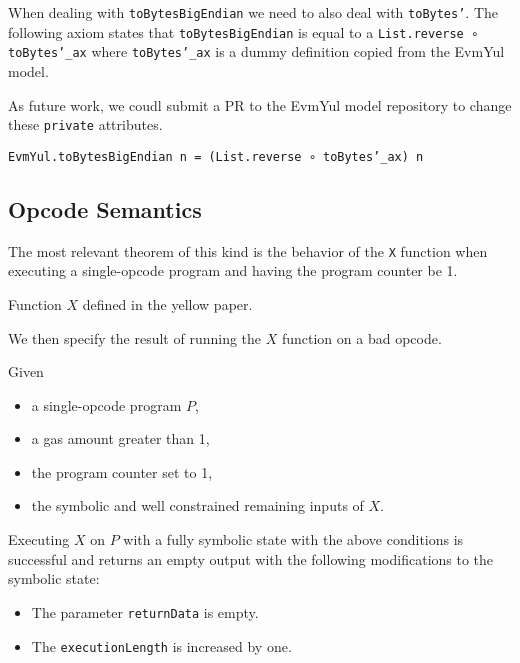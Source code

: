When dealing with \texttt{toBytesBigEndian} we need to also deal with
\texttt{toBytes'}. The following axiom states that \texttt{toBytesBigEndian} is
equal to a \texttt{List.reverse ∘ toBytes'_ax} where \texttt{toBytes'_ax} is a
dummy definition copied from the EvmYul model.

As future work, we coudl submit a PR to the EvmYul model repository to change
these \texttt{private} attributes.

\begin{theorem}
\label{thm:toBytesBigEndian_rw}
\texttt{EvmYul.toBytesBigEndian n = (List.reverse ∘ toBytes'_ax) n}
\end{theorem}

\subsection{Opcode Semantics}

The most relevant theorem of this kind is the behavior of the \texttt{X}
function when executing a single-opcode program and having the program counter
be 1.

\begin{definition}\label{def:X}\leanok
Function $X$ defined in the yellow paper.
\end{definition}

We then specify the result of running the $X$ function on a bad opcode.

\begin{theorem}[X_bad_pc]\label{thm:X_bad_pc}\leanok
Given
\begin{itemize}
\item a single-opcode program $P$,
\item a gas amount greater than 1,
\item the program counter set to 1,
\item the symbolic and well constrained remaining inputs of $X$.
\end{itemize}
Executing $X$ on $P$ with a fully symbolic state with the above conditions
is successful and returns an empty output with the following modifications to
the symbolic state:
\begin{itemize}
\item The parameter \texttt{returnData} is empty.
\item The \texttt{executionLength} is increased by one.
\end{itemize}
\end{theorem}

